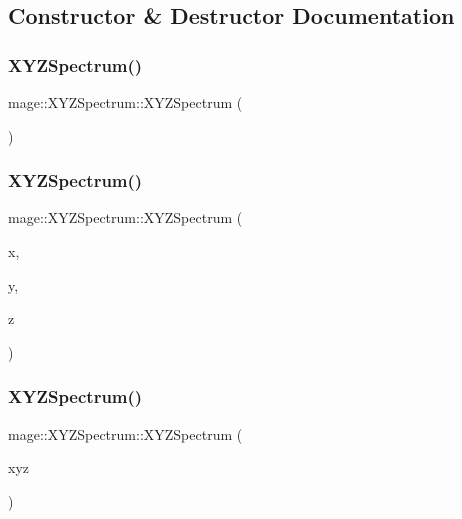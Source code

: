 \subsection{Constructor \& Destructor Documentation}
\hypertarget{structmage_1_1_x_y_z_spectrum_a93dbb49e9cb90dd0aed70e9b6d01fcc8}{}\label{structmage_1_1_x_y_z_spectrum_a93dbb49e9cb90dd0aed70e9b6d01fcc8} 
\subsubsection{\texorpdfstring{X\+Y\+Z\+Spectrum()}{XYZSpectrum()}\hspace{0.1cm}{\footnotesize\ttfamily [1/8]}}
{\footnotesize\ttfamily mage\+::\+X\+Y\+Z\+Spectrum\+::\+X\+Y\+Z\+Spectrum (\begin{DoxyParamCaption}{ }\end{DoxyParamCaption})}

\hypertarget{structmage_1_1_x_y_z_spectrum_ab768ef493970dd791f8b145eee05f66b}{}\label{structmage_1_1_x_y_z_spectrum_ab768ef493970dd791f8b145eee05f66b} 
\subsubsection{\texorpdfstring{X\+Y\+Z\+Spectrum()}{XYZSpectrum()}\hspace{0.1cm}{\footnotesize\ttfamily [2/8]}}
{\footnotesize\ttfamily mage\+::\+X\+Y\+Z\+Spectrum\+::\+X\+Y\+Z\+Spectrum (\begin{DoxyParamCaption}\item[{float}]{x,  }\item[{float}]{y,  }\item[{float}]{z }\end{DoxyParamCaption})}

\hypertarget{structmage_1_1_x_y_z_spectrum_ac86feefa604d578f219d17f721508357}{}\label{structmage_1_1_x_y_z_spectrum_ac86feefa604d578f219d17f721508357} 
\subsubsection{\texorpdfstring{X\+Y\+Z\+Spectrum()}{XYZSpectrum()}\hspace{0.1cm}{\footnotesize\ttfamily [3/8]}}
{\footnotesize\ttfamily mage\+::\+X\+Y\+Z\+Spectrum\+::\+X\+Y\+Z\+Spectrum (\begin{DoxyParamCaption}\item[{const \hyperlink{structmage_1_1_x_y_z_spectrum}{X\+Y\+Z\+Spectrum} \&}]{xyz }\end{DoxyParamCaption})}

